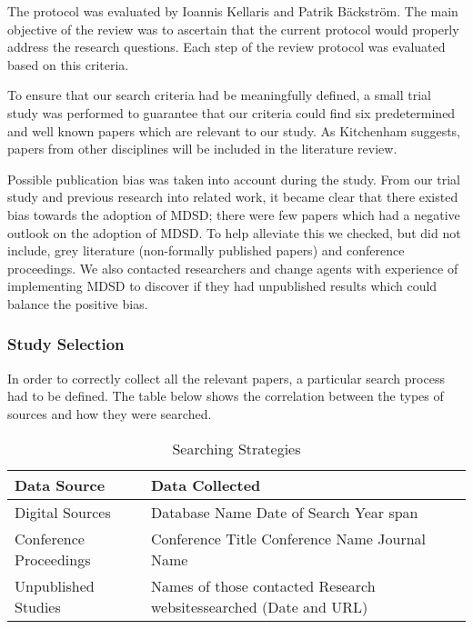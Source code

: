 \documentclass[10pt,twocolumn]{article}
\begin{document}
The protocol was evaluated by Ioannis Kellaris and Patrik B\"ackstr\"om. The main objective of the review was to ascertain that the current protocol would properly address the research questions. Each step of the review protocol was evaluated based on this criteria. 


To ensure that our search criteria had be meaningfully defined, a small trial study was performed to guarantee that our criteria could find six predetermined and well known papers which are relevant to our study. As Kitchenham \cite{kitchenham2007guidelines} suggests, papers from other disciplines will be included in the literature review. 

Possible publication bias was taken into account during the study. From our trial study and previous research into related work, it became clear that there existed bias towards the adoption of MDSD; there were few papers which had a negative outlook on the adoption of MDSD. To help alleviate this we checked, but did not include, grey literature (non-formally published papers) and conference proceedings. We also contacted researchers and change agents with experience of implementing MDSD to discover if they had unpublished results which could balance the positive bias. 

\subsubsection{Study Selection}

In order to correctly collect all the relevant papers, a particular search process had to be defined. The table below shows the correlation between the types of sources and how they were searched.

\begin{table}[ht]
	\centering
    \begin{tabular}{ | l | p{3.5cm} |}
    \hline
    \textbf{Data Source} & \textbf{Data Collected} \\ \hline
    Digital Sources & Database Name \newline Date of Search \newline Year span \\ \hline
    Conference Proceedings & Conference Title \newline Conference Name \newline Journal Name \\ \hline
    Unpublished Studies & Names of those contacted \newline Research websites\newline searched (Date and URL) \\
    \hline
    \end{tabular}
	\caption{Searching Strategies}
\end{table}
\end{document}

